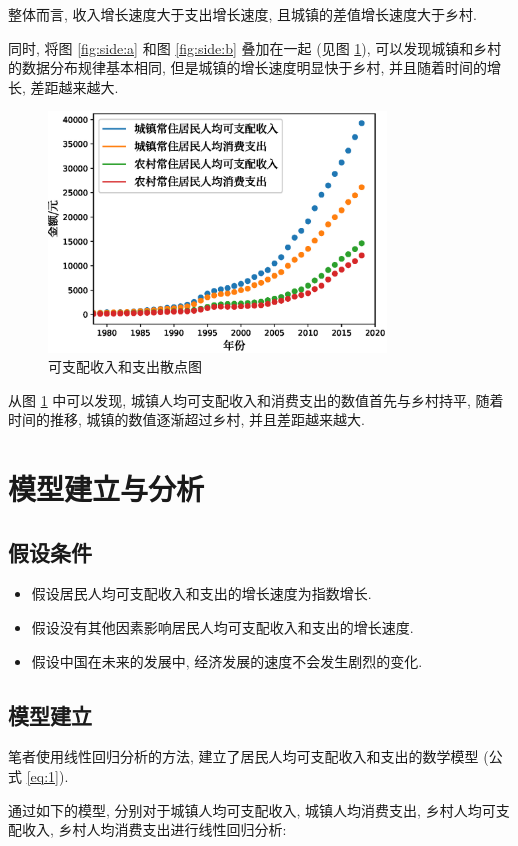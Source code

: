 \documentclass{article}
\begin{document}
\par 整体而言, 收入增长速度大于支出增长速度, 且城镇的差值增长速度大于乡村.\\
\par 同时, 将图 \ref{fig:side:a} 和图 \ref{fig:side:b} 叠加在一起 (见图 \ref{fig:side:c}), 可以发现城镇和乡村的数据分布规律基本相同, 但是城镇的增长速度明显快于乡村, 并且随着时间的增长, 差距越来越大.\\
\begin{figure}[H]
  \centering
  \includegraphics[width=0.8\textwidth]{figures/plot1.eps}
  \caption{可支配收入和支出散点图}
  \label{fig:side:c}
\end{figure}
从图 \ref{fig:side:c} 中可以发现, 城镇人均可支配收入和消费支出的数值首先与乡村持平, 随着时间的推移, 城镇的数值逐渐超过乡村, 并且差距越来越大.\\

\section{模型建立与分析}\label{sec:model}

\subsection{假设条件}

\begin{itemize}
  \item 假设居民人均可支配收入和支出的增长速度为指数增长.
  \item 假设没有其他因素影响居民人均可支配收入和支出的增长速度.
  \item 假设中国在未来的发展中, 经济发展的速度不会发生剧烈的变化.
\end{itemize}

\subsection{模型建立}
\par 笔者使用线性回归分析的方法, 建立了居民人均可支配收入和支出的数学模型 (公式 \ref{eq:1}).\\
\par 通过如下的模型, 分别对于城镇人均可支配收入, 城镇人均消费支出, 乡村人均可支配收入, 乡村人均消费支出进行线性回归分析:
\end{document}
